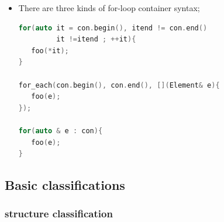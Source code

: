 \documentclass[a4paper,11pt,twoside]{book}
\begin{document}
\begin{itemize}
\item There are three kinds of for-loop container syntax;
\begin{lstlisting}[frame=single, language=c++]
for(auto it = con.begin(), itend != con.end()
         it !=itend ; ++it){
   foo(*it);
}

for_each(con.begin(), con.end(), [](Element& e){
   foo(e);
});

for(auto & e : con){
   foo(e);
}
\end{lstlisting}

\end{itemize}


\subsection{Basic classifications}
\subsubsection{structure classification}
\end{document}
